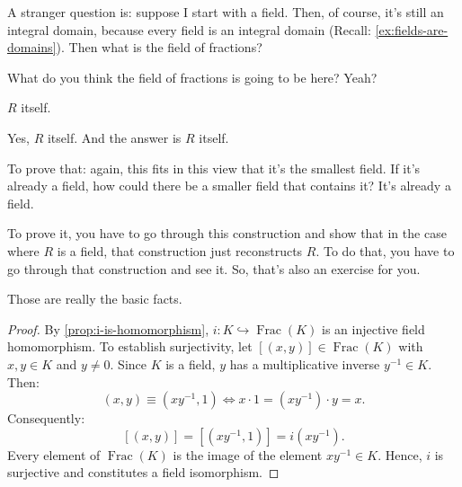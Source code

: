 \begin{speech}[01:14:49 - 01:15:25]
A stranger question is: suppose I start with a field.  Then, of course, it's still an integral domain,  because every field is an integral domain (Recall: \cref{ex:fields-are-domains}). Then what is the field of fractions? 

What do you think the field of fractions is going to be here? Yeah?
\end{speech}

\begin{student}
$R$ itself.
\end{student}

\begin{speech}[01:15:28 - 01:16:00]
Yes, $R$ itself. And the answer is $R$ itself. 

To prove that: again, this fits in this view that it's the smallest field. If it's already a field, how could there be a smaller field that contains it? It's already a field.

To prove it, you have to go through this construction and show that in the case where $R$ is a field, that construction just reconstructs $R$. To do that, you have to go through that construction and see it. So, that's also an exercise for you.

Those are really the basic facts.
\end{speech}

\begin{content}

\begin{proof}
By \cref{prop:i-is-homomorphism}, $i \colon K \hookrightarrow \operatorname{Frac}(K)$ is an injective field homomorphism. To establish surjectivity, let $[(x, y)] \in \operatorname{Frac}(K)$ with $x, y \in K$ and $y \ne 0$.
Since $K$ is a field, $y$ has a multiplicative inverse $y^{-1} \in K$. Then:
\[
(x, y) \equiv (x y^{-1}, 1) \iff x \cdot 1 = (x y^{-1}) \cdot y = x.
\]
Consequently:
\[
[(x, y)] = [(x y^{-1}, 1)] = i(x y^{-1}).
\]
Every element of $\operatorname{Frac}(K)$ is the image of the element $x y^{-1} \in K$. Hence, $i$ is surjective and constitutes a field isomorphism.
\end{proof}
\end{content}

